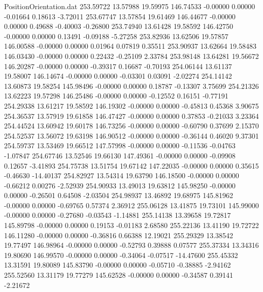 \begin{filecontents}{PositionOrientation.dat}
 253.59722   13.57988   19.59975   146.74533   -0.00000    0.00000   -0.01664    0.18613   -3.72011
 253.67747   13.57854   19.61469   146.44677   -0.00000    0.00000    0.49688   -0.40003   -0.26800
 253.74940   13.61428   19.58592   146.42750   -0.00000    0.00000    0.13491   -0.09188   -5.27258
 253.82936   13.62506   19.57857   146.00588   -0.00000    0.00000    0.01964    0.07819    0.35511
 253.90937   13.62664   19.58483   146.03430   -0.00000    0.00000    0.22432   -0.25109    2.33784
 253.98148   13.64281   19.56672   146.20287   -0.00000    0.00000   -0.39317    0.16687   -0.70193
 254.06144   13.61137   19.58007   146.14674   -0.00000    0.00000   -0.03301    0.03091   -2.02274
 254.14142   13.60873   19.58254   145.98496   -0.00000    0.00000    0.18787   -0.13307    3.75699
 254.21326   13.62223   19.57298   146.25486   -0.00000    0.00000   -0.12552    0.16151   -0.77191
 254.29338   13.61217   19.58592   146.19302   -0.00000    0.00000   -0.45813    0.45368    3.90675
 254.36537   13.57919   19.61858   146.47427   -0.00000    0.00000    0.37853   -0.21033    3.23364
 254.44524   13.60942   19.60178   146.73256   -0.00000    0.00000   -0.60790    0.37699    2.15370
 254.52537   13.56072   19.63198   146.90512   -0.00000    0.00000   -0.36144    0.46020    9.37301
 254.59737   13.53469   19.66512   147.57998   -0.00000    0.00000   -0.11536   -0.04763   -1.07847
 254.67746   13.52546   19.66130   147.49361   -0.00000    0.00000   -0.09908    0.12657   -3.41893
 254.75738   13.51754   19.67142   147.22035   -0.00000    0.00000    0.35615   -0.46630  -14.40137
 254.82927   13.54314   19.63790   146.18500   -0.00000    0.00000   -0.66212    0.00276   -2.52939
 254.90933   13.49013   19.63812   145.98250   -0.00000    0.00000   -0.26501    0.64508   -2.03504
 254.98937   13.46892   19.68975   145.81962   -0.00000    0.00000   -0.69765    0.57374    2.36912
 255.06128   13.41875   19.73101   145.99000   -0.00000    0.00000   -0.27680   -0.03543   -1.14881
 255.14138   13.39658   19.72817   145.89798   -0.00000    0.00000    0.19153   -0.01183    2.68580
 255.22136   13.41190   19.72722   146.11280   -0.00000    0.00000   -0.36816    0.66388   12.19021
 255.29329   13.38542   19.77497   146.98964   -0.00000    0.00000   -0.52793    0.39888    0.07577
 255.37334   13.34316   19.80690   146.99570   -0.00000    0.00000   -0.34064   -0.07517  -14.47600
 255.45332   13.31591   19.80089   145.83790   -0.00000    0.00000   -0.05710   -0.38885   -2.94162
 255.52560   13.31179   19.77279   145.62528   -0.00000    0.00000   -0.34587    0.39141   -2.21672

\end{filecontents}
